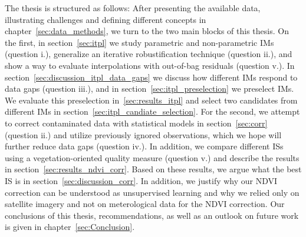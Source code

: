 The thesis is structured as follows: After presenting the available data, illustrating challenges and defining different concepts in chapter~\ref{sec:data_methods}, we turn to the two main blocks of this thesis. 
On the first, in section~\ref{sec:itpl} we study parametric and non-parametric {{IM}}s (question i.), generalize an iterative robustification technique (question ii.), and show a way to evaluate interpolations with out-of-bag residuals (question v.). In section~\ref{sec:discussion_itpl_data_gaps} we discuss how different {{IM}}s respond to data gaps (question iii.), and in section~\ref{sec:itpl_preselection} we preselect {{IM}}s. We evaluate this preselection in~\ref{sec:results_itpl} and select two candidates from different {{IM}}s in section~\ref{sec:itpl_candiate_selection}.
For the second, we attempt to correct contaminated data with statistical models in section~\ref{sec:corr} (question ii.) and utilize previously ignored observations, which we hope will further reduce data gaps (question iv.). In addition, we compare different {{ISs}} using a vegetation-oriented quality measure (question v.) and describe the results in section~\ref{sec:results_ndvi_corr}. Based on these results, we argue what the best {{IS}} is in section~\ref{sec:discussion_corr}. In addition, we justify why our NDVI correction can be understood as unsupervised learning and why we relied only on satellite imagery and not on meterological data for the NDVI correction.
Our conclusions of this thesis, recommendations, as well as an outlook on future work is given in chapter~\ref{sec:Conclusion}. 








